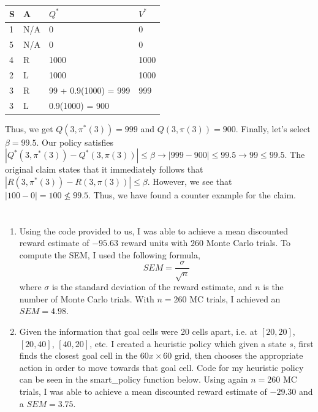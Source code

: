 \documentclass[11pt]{article}
\begin{document}
    \begin{tabular}{|l|l|l|l|}
    \hline
    S & A    & $Q^*$ & $V^*$ \\ \hline
    1 & N/A  & 0                  & 0                    \\ \hline
    5 & N/A  & 0                  & 0                    \\ \hline
    4 & R & 1000 & 1000 \\ \hline
    2 & L & 1000 & 1000 \\ \hline
    3 & R & 99 + 0.9(1000) = 999 & 999 \\ \hline
    3 & L & 0.9(1000) = 900 &  \\ \hline
    \end{tabular} \newline \newline

    Thus, we get $Q(3,\pi^*(3)) = 999$ and $Q(3,\pi(3)) = 900$. Finally, let's select $\beta = 99.5$.
    Our policy satisfies $|Q^*(3, \pi^*(3)) - Q^*(3, \pi(3))| \leq \beta \rightarrow |999 - 900| \leq 99.5 \rightarrow 99 \leq 99.5$. 
    The original claim states that it immediately follows that $|R(3, \pi^*(3)) - R(3, \pi(3))| \leq \beta$. However, we see that 
    $|100 - 0| = 100 \nleq 99.5$. Thus, we have found a counter example for the claim.


\section{}

\begin{enumerate} [label=\alph*)]
    \item
        Using the code provided to us, I was able to achieve a mean discounted reward estimate of $-95.63$ reward units with $260$ Monte Carlo trials.
        To compute the SEM, I used the following formula, 
        \[
            SEM = \frac{\sigma}{\sqrt{n}}
        \]
        where $\sigma$ is the standard deviation of the reward estimate, and $n$ is the number of Monte Carlo trials. With $n = 260$ MC trials, I achieved an 
        $SEM = 4.98$.
        
    \item 
        Given the information that goal cells were 20 cells apart, i.e. at $[20,20]$, $[20,40]$, $[40,20]$, etc. I 
        created a heuristic policy which given a state $s$, first finds the closest goal cell in the $60x \times 60$ grid, then chooses the appropriate
        action in order to move towards that goal cell. Code for my heuristic policy can be seen in the smart\_policy function below. Using again $n = 260$ MC trials,
        I was able to achieve a mean discounted reward estimate of $-29.30$ and a $SEM = 3.75$.
\end{enumerate}
\end{document}

